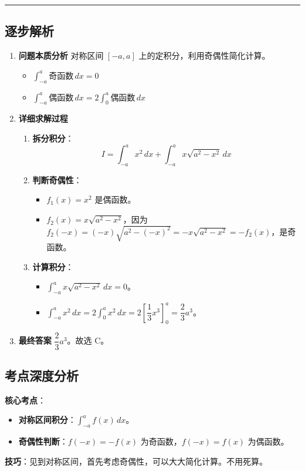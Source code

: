 \documentclass[UTF8,10pt]{ctexart}
\newenvironment{redenv}{\color{red}}{}
\newenvironment{detailedanalysis}{%
    \color{red}
    \begin{enumerate}[label=\textbf{第\arabic*步：}, leftmargin=*, align=left, itemsep=0pt, parsep=0pt, topsep=0pt, partopsep=0pt]
}{%
    \end{enumerate}
}
\newenvironment{conceptbox}{%
    \begin{tcolorbox}[colback=red!5, colframe=red!50!black, title=概念解析, fonttitle=\bfseries, top=2pt, bottom=2pt, left=2pt, right=2pt]
}{%
    \end{tcolorbox}
}
\newcommand{\analysisrule}{\noindent\rule{\textwidth}{0.8pt}\vspace{-0.5em}}
\begin{document}
\begin{redenv}
\analysisrule
\subsection*{逐步解析}

\begin{detailedanalysis}
\item \textbf{问题本质分析}
对称区间 $[-a, a]$ 上的定积分，利用奇偶性简化计算。
\begin{itemize}
    \item $\int_{-a}^a \text{奇函数} \, dx = 0$
    \item $\int_{-a}^a \text{偶函数} \, dx = 2\int_0^a \text{偶函数} \, dx$
\end{itemize}

\item \textbf{详细求解过程}
\begin{enumerate}[label=(\alph*)]
    \item \textbf{拆分积分}：
    \[ I = \int_{-a}^a x^2 \, dx + \int_{-a}^a x\sqrt{a^2-x^2} \, dx \]
    \item \textbf{判断奇偶性}：
    \begin{itemize}
        \item $f_1(x) = x^2$ 是偶函数。
        \item $f_2(x) = x\sqrt{a^2-x^2}$，因为 $f_2(-x) = (-x)\sqrt{a^2-(-x)^2} = -x\sqrt{a^2-x^2} = -f_2(x)$，是奇函数。
    \end{itemize}
    \item \textbf{计算积分}：
    \begin{itemize}
        \item $\int_{-a}^a x\sqrt{a^2-x^2} \, dx = 0$。
        \item $\int_{-a}^a x^2 \, dx = 2\int_0^a x^2 \, dx = 2 \left[ \dfrac{1}{3}x^3 \right]_0^a = \dfrac{2}{3}a^3$。
    \end{itemize}
\end{enumerate}

\item \textbf{最终答案}
$\dfrac{2}{3}a^3$。故选 C。
\end{detailedanalysis}

\subsection*{考点深度分析}
\begin{conceptbox}
\textbf{核心考点}：
\begin{itemize}
    \item \textbf{对称区间积分}：$\int_{-a}^a f(x)\, dx$。
    \item \textbf{奇偶性判断}：$f(-x) = -f(x)$ 为奇函数，$f(-x) = f(x)$ 为偶函数。
\end{itemize}
\textbf{技巧}：见到对称区间，首先考虑奇偶性，可以大大简化计算。不用死算。
\end{conceptbox}
\end{redenv}
\end{document}

